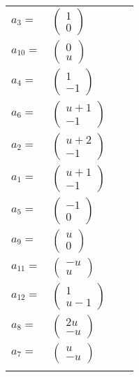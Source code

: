 \documentclass[1p]{elsarticle_modified}
\theoremstyle{definition}
\begin{document}
\begin{tabular}{m{7pt} m{180pt} m{7pt} m{180pt} }
\flushright $a_{3}=$&$\begin{pmatrix}1\\0\end{pmatrix}$ \\
\flushright $a_{10}=$&$\begin{pmatrix}0\\u\end{pmatrix}$ \\
\flushright $a_{4}=$&$\begin{pmatrix}1\\-1\end{pmatrix}$ \\
\flushright $a_{6}=$&$\begin{pmatrix}u+1\\-1\end{pmatrix}$ \\
\flushright $a_{2}=$&$\begin{pmatrix}u+2\\-1\end{pmatrix}$ \\
\flushright $a_{1}=$&$\begin{pmatrix}u+1\\-1\end{pmatrix}$ \\
\flushright $a_{5}=$&$\begin{pmatrix}-1\\0\end{pmatrix}$ \\
\flushright $a_{9}=$&$\begin{pmatrix}u\\0\end{pmatrix}$ \\
\flushright $a_{11}=$&$\begin{pmatrix}- u\\u\end{pmatrix}$ \\
\flushright $a_{12}=$&$\begin{pmatrix}1\\u-1\end{pmatrix}$ \\
\flushright $a_{8}=$&$\begin{pmatrix}2 u\\- u\end{pmatrix}$ \\
\flushright $a_{7}=$&$\begin{pmatrix}u\\- u\end{pmatrix}$\\&\end{tabular}
\end{document}
